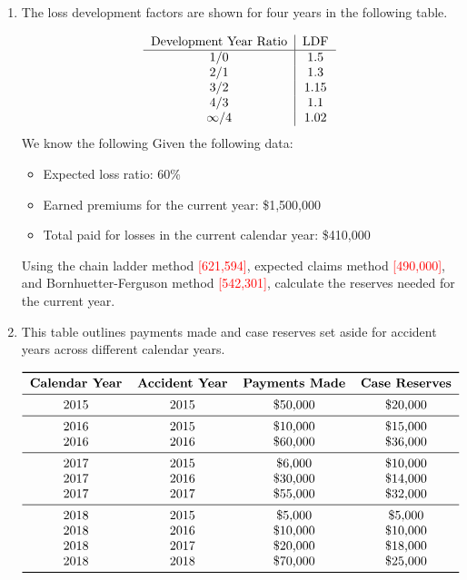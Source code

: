 \documentclass{article}
\begin{document}
\begin{enumerate}
    \item The loss development factors are shown for four years in the following table. 
    
    \[
    \begin{tabular}{c|c}
    Development Year Ratio & LDF \\
    \hline
    1/0 & 1.5 \\
    2/1 &1.3\\
    3/2 & 1.15\\
    4/3 & 1.1 \\
    $\infty$/4 & 1.02
    \end{tabular}
    \]
    We know the following
    Given the following data:
\begin{itemize}
    \item Expected loss ratio: 60\%
    \item Earned premiums for the current year: \$1,500,000
    \item Total paid for losses in the current calendar year: \$410,000
\end{itemize}

    Using the chain ladder method \textcolor{red}{[621,594]}, expected claims method \textcolor{red}{[490,000]}, and Bornhuetter-Ferguson method \textcolor{red}{[542,301]}, calculate the reserves needed for the current year.

\newpage

    \item
    
    
\vspace{0.3in}

This table outlines payments made and case reserves set aside for accident years across different calendar years.

\[
\begin{tabular}{cccccc}
\toprule
\textbf{Calendar Year} & \textbf{Accident Year} & \textbf{Payments Made} & \textbf{Case Reserves} \\
\midrule
2015 & 2015 & \$50,000 & \$20,000 \\
\midrule
2016 & 2015 & \$10,000 & \$15,000 \\
2016 & 2016 & \$60,000 & \$36,000 \\
\midrule
2017 & 2015 & \$6,000 & \$10,000 \\
2017 & 2016 & \$30,000 & \$14,000 \\
2017 & 2017 & \$55,000 & \$32,000 \\
\midrule
2018 & 2015 & \$5,000 & \$5,000 \\
2018 & 2016 & \$10,000 & \$10,000 \\
2018 & 2017 & \$20,000 & \$18,000 \\
2018 & 2018 & \$70,000 & \$25,000 \\
\bottomrule
\end{tabular}
\]


\end{enumerate}
\end{document}

